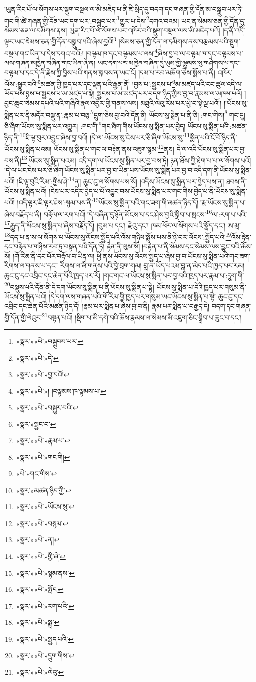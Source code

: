 །ཡུན་རིང་པོ་ལ་སོགས་པར་སྡུག་བསྔལ་ལ་མི་མཇེད་པ་ནི་ཇི་སྲིད་དུ་བདག་དང་གཞན་གྱི་དོན་མ་བསྒྲུབ་པར་ཏེ། གང་གི་ཚེ་གཞན་གྱི་དོན་ཡང་དག་པར་:བསྒྲུབ་པར་\footnote{«སྣར་»«པེ་»བསྒྲུབས་པར་}གྱུར་པ་དེས་\footnote{«སྣར་»«པེ་»དེ་}དགའ་བའམ། ཡང་ན་སེམས་ཅན་གྱི་དོན་དུ་སེམས་ཅན་ལ་དམིགས་ནས། ཡུན་རིང་པོ་ལ་སོགས་པར་འཁོར་བའི་སྡུག་བསྔལ་ལས་མི་མཇེད་པའོ། །ད་ནི་འདི་ལྟར་ཡང་སེམས་ཅན་གྱི་དོན་བསྒྲུབ་པའི་ཞེས་བྱའོ།\footnote{«སྣར་»«པེ་»བྱ་བའོ།} །སེམས་ཅན་གྱི་དོན་ལ་དམིགས་ནས་བརྩམས་པའི་སྡུག་བསྔལ་གང་ཡིན་པ་དེས་དགའ་བའོ:། །བལྟམ་ཁ་དང་བལྟམས་པ་ལས་\footnote{«སྣར་»«པེ་»། །བལྟམས་ཁ་ལྟམས་པ་}ཞེས་བྱ་བ་ལ་བལྟམ་ཁ་དང་བལྟམས་པ་ལས་གཞན་མཁྱེན་བཞིན་གང་ཡིན་ཞེ་ན། ཡང་དག་པར་མཁྱེན་བཞིན་དུ་ཡུམ་གྱི་ལྷུམས་སུ་གཤེགས་པ་དང་། བལྟམ་པ་དང་དེ་ནི་རྗེས་ཀྱི་བྱིས་པའི་གནས་སྐབས་ན་ཡང་ངོ། །དམ་པ་རབ་མཆོག་ཅེས་སྨོས་པ་ནི། འཁོར་ལོས་:སྒྱུར་བའི་\footnote{«སྣར་»«པེ་»བསྒྱུར་བའི་}མཚན་གྱི་ཁྱད་པར་དང་ལྡན་པའི་རྒྱན་ནོ། །བྱས་པ་:སྦྱངས་པ་\footnote{«སྣར་»སྦྱང་བ་}མ་མཛད་པའི་ངང་ཚུལ་འདི་ལ་ཡོད་པས་བྱས་པ་སྦྱངས་པ་མ་མཛད་པ་སྟེ། སྦྱངས་པ་མ་མཛད་པར་བདག་ཉིད་ཀྱིས་བྱ་བ་རྣམས་ལ་མཁས་པའོ། །བྱང་ཆུབ་སེམས་དཔའི་སའི་གཞིའི་རྣལ་འབྱོར་གྱི་གནས་ལས། མཐུའི་ལེའུ་རིམ་པར་ཕྱེ་བ་སྟེ་ལྔ་པའོ།། །།ཡོངས་སུ་སྨིན་པར་ནི་མདོར་བསྡུ་ན་:རྣམ་པ་བཅུ་\footnote{«སྣར་»«པེ་»རྣམ་པ་}དྲུག་ཅེས་བྱ་བའི་དོན་ནི། ཡོངས་སུ་སྨིན་པ་ནི་ཅི། :གང་གིས།\footnote{«སྣར་»«པེ་»གང་གི།} གང་དུ། ཅི་ཞིག་ཡོངས་སུ་སྨིན་པར་འགྱུར། :གང་གི་\footnote{«པེ་»གང་གིས་}གང་ཞིག་གིས་ཡོངས་སུ་སྨིན་པར་བྱེད། ཡོངས་སུ་སྨིན་པའི་:མཚན་ཉིད་ནི་\footnote{«སྣར་»མཚན་ཉིད་ཀྱི་}ཇི་ལྟ་བུར་འབྱུང་ཞེས་བྱ་བའོ། །དེ་ལ་:ཡོངས་སུ་ངེས་པར་ཅི་ཞིག་ཡོངས་སུ་\footnote{«སྣར་»«པེ་»ཡོངས་སུ་}སྨིན་པའི་ངོ་བོ་ཉིད་ནི་ཡོངས་སུ་སྨིན་པའམ། ཡོངས་སུ་སྨིན་པ་གང་ལ་བརྟེན་ནས་འཇུག་སྙམ་\footnote{«སྣར་»«པེ་»བསྙམ་}ནས། དེ་ལ་འདི་ཡོངས་སུ་སྨིན་པར་བྱ་བས་ནི།\footnote{«སྣར་»«པེ་»ན།} ཡོངས་སུ་སྨིན་པའམ། འདི་དག་ལ་ཡོངས་སུ་སྨིན་པར་བྱ་བས་ཏེ། ཉན་ཐོས་ཀྱི་ཐེག་པ་པ་ལ་སོགས་པའོ། །དེ་ལ་ཡང་ངེས་པར་ཅི་ཞིག་ཡོངས་སུ་སྨིན་པར་བྱ་བ་ཡིན་པས་ཡོངས་སུ་སྨིན་པར་བྱ་བ་འདི་དག་ནི་ཡོངས་སུ་སྨིན་པའོ། །ཇི་ལྟ་བུའི་རིམ་:གྱིས་ཤེ་\footnote{«སྣར་»«པེ་»གྱི་ཞེ་}ན། ཆུང་ངུ་ལ་སོགས་པས་སོ། །འདིས་ཡོངས་སུ་སྨིན་པར་བྱེད་པས་ན། ཐབས་ནི་ཡོངས་སུ་སྨིན་པའོ། །ངེས་པར་འདིར་བྱེད་པ་པོ་འབྱུང་བས་ཡོངས་སུ་སྨིན་པར་གང་གིས་བྱེད་པ་ནི་ཡོངས་སུ་སྨིན་པའོ། །འདི་ལྟར་ཇི་ལྟར་ཤེས་:སྙམ་པས་ནི་\footnote{«སྣར་»«པེ་»སྙམ་ནས་}ཡོངས་སུ་སྨིན་པའི་གང་ཟག་གི་མཚན་ཉིད་དོ། །རྨ་ཡོངས་སུ་སྨིན་པ་ཞེས་བརྗོད་པ་ནི། བརྟོལ་ལ་རག་པའོ། །དེ་བཞིན་དུ་ཉོན་མོངས་པ་དང་ཤེས་བྱའི་སྒྲིབ་པ་སྤངས་\footnote{«སྣར་»«པེ་»སྤོང་}ལ་:རག་པ་པའི་\footnote{«སྣར་»«པེ་»རག་པའི་}རྒྱུད་ནི་ཡོངས་སུ་སྨིན་པ་ཞེས་བརྗོད་དོ། །བུམ་པ་དང་། རྗེའུ་དང་། ཁམ་ཕོར་ལ་སོགས་པའི་སྣོད་དང་། ཨ་མྲ་\footnote{«སྣར་»«པེ་»སྨྲ་}དད་པ་ན་ས་ལ་སོགས་པ་ཡོངས་སུ་ལོངས་སྤྱོད་པའི་འོས་གཉིས་སྨོས་པས་ནི་ཉེ་བར་ལོངས་:སྤྱོད་པའི་\footnote{«སྣར་»«པེ་»སྤྱད་པའི་}འོས་རྟེན་དང་བརྟེན་པ་གཉིས་རབ་ཏུ་བསྟན་པའི་དོན་ཏེ། རྟེན་ནི་ལུས་སོ། །བརྟེན་པ་ནི་སེམས་དང་སེམས་ལས་བྱུང་བའི་ཆོས་སོ། །གོ་རིམ་ནི་དང་པོར་བརྟོལ་བ་ཡིན་ལ། ཕྱི་ནས་ཡོངས་སུ་ལོངས་སྤྱད་པ་ཞེས་བྱ་བ་ཡོངས་སུ་སྨིན་པའི་གང་ཟག་རིགས་ལ་གནས་པ་དང་། རིགས་ལ་མི་གནས་པའི་བྱེ་བྲག་གམ། བླ་ན་ཡོད་པའམ་བླ་ན་མེད་པའི་ཁྱད་པར་རམ། ཆུང་ངུ་དང་འབྲིང་དང་ཆེན་པོའི་ཁྱད་པར་རོ། །གང་གང་ལ་ཡོངས་སུ་སྨིན་པར་བྱ་བའི་ཁྱད་པར་རྣམ་པ་:དྲུག་གི་\footnote{«སྣར་»«པེ་»དྲུག་གིས་}བསྡུས་པའི་དོན་ནི་དེ་དག་ཡོངས་སུ་སྨིན་པ་ནི་ཡོངས་སུ་སྨིན་པ་སྟེ། ཡོངས་སུ་སྨིན་པ་དེའི་ཁྱད་པར་གསུམ་ནི་ཡོངས་སུ་སྨིན་པའོ། །དེ་དག་ལས་གཞན་པའི་གོ་རིམ་གྱི་ཁྱད་པར་གསུམ་ཡང་ཡོངས་སུ་སྨིན་པ་སྟེ། ཆུང་ངུ་དང་འབྲིང་དང་ཆེན་པོའི་མཚན་ཉིད་དོ། །རྣམ་པར་སྨིན་པ་ཞེས་བྱ་བ་ནི། རྣམ་པར་སྨིན་པ་བརྒྱད་དེ། བདག་དང་གཞན་གྱི་དོན་གྱི་ལེའུར་\footnote{«སྣར་»«པེ་»ལེའུ་}བསྟན་པའོ། །སྡིག་པ་མི་དགེ་བའི་ཆོས་རྣམས་ལ་སེམས་མི་འཇུག་ཅིང་སྒྲིབ་པ་ཆུང་བ་དང་། 
